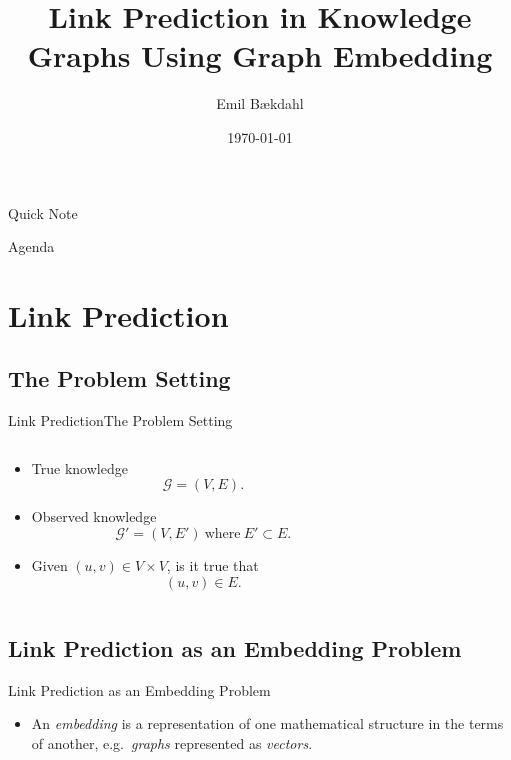 \documentclass[10pt, aspectratio = 1610, hide notes]{beamer}
\title{Link Prediction in Knowledge Graphs Using Graph Embedding}
\date{\today}
\author{Emil Bækdahl}
\institute{
  Department of Computer Science \\
  Aalborg University
}
\begin{document}
{\aauwavesbg%
\begin{frame}
  \titlepage%
\end{frame}}

\begin{frame}{Quick Note}
\end{frame}

\begin{frame}{Agenda}
  \tableofcontents
\end{frame}

\section{Link Prediction}
\subsection{The Problem Setting}
\begin{frame}{Link Prediction}{The Problem Setting}
  \begin{columns}
    \begin{column}{0.5 \textwidth}
      \begin{itemize}[<+->]
        \item True knowledge 
          \[\mathcal{G} = (V, E).\]
        \item Observed knowledge
          \[\mathcal{G'} = (V, E') \ \text{where} \ E' \subset E.\]
        \item Given $(u, v) \in V \times V$, is it true that
          \[(u, v) \in E.\]
      \end{itemize}
    \end{column}
    \begin{column}{0.5 \textwidth}
      \centering
      
    \end{column}
  \end{columns}
\end{frame}

\subsection{Link Prediction as an Embedding Problem}
\begin{frame}{Link Prediction as an Embedding Problem}
  \begin{itemize}
    \item An \emph{embedding} is a representation of one mathematical structure in the terms of another, e.g.\ \emph{graphs} represented as \emph{vectors}.
  \end{itemize}
\end{frame}
\end{document}
